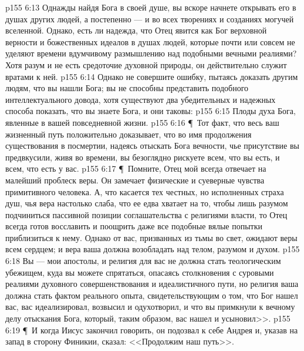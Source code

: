 \vs p155 6:13 Однажды найдя Бога в своей душе, вы вскоре начнете открывать его в душах других людей, а постепенно --- и во всех творениях и созданиях могучей вселенной. Однако, есть ли надежда, что Отец явится как Бог верховной верности и божественных идеалов в душах людей, которые почти или совсем не уделяют времени вдумчивому размышлению над подобными вечными реалиями? Хотя разум и не есть средоточие духовной природы, он действительно служит вратами к ней.
\vs p155 6:14 Однако не совершите ошибку, пытаясь доказать другим людям, что вы нашли Бога; вы не способны представить подобного интеллектуального довода, хотя существуют два убедительных и надежных способа показать, что вы знаете Бога, и они таковы:
\vs p155 6:15 \bibnobreakspace Плоды духа Бога, явленные в вашей повседневной жизни.
\vs p155 6:16 \P\ \bibnobreakspace Тот факт, что весь ваш жизненный путь положительно доказывает, что во имя продолжения существования в посмертии, надеясь отыскать Бога вечности, чье присутствие вы предвкусили, живя во времени, вы безоглядно рискуете всем, что вы есть, и всем, что есть у вас.
\vs p155 6:17 \P\ Помните, Отец мой всегда отвечает на малейший проблеск веры. Он замечает физические и суеверные чувства примитивного человека. А, что касается тех честных, но исполненных страха душ, чья вера настолько слаба, что ее едва хватает на то, чтобы лишь разумом подчиниться пассивной позиции соглашательства с религиями власти, то Отец всегда готов восславить и поощрить даже все подобные вялые попытки приблизиться к нему. Однако от вас, призванных из тьмы во свет, ожидают веры всем сердцем; и вера ваша должна возобладать над телом, разумом и духом.
\vs p155 6:18 Вы --- мои апостолы, и религия для вас не должна стать теологическим убежищем, куда вы можете спрятаться, опасаясь столкновения с суровыми реалиями духовного совершенствования и идеалистичного пути, но религия ваша должна стать фактом реального опыта, свидетельствующим о том, что Бог нашел вас, вас идеализировал, возвысил и одухотворил, и что вы примкнули к вечному делу отыскания Бога, который, таким образом, вас нашел и усыновил>>.
\vs p155 6:19 \P\ И когда Иисус закончил говорить, он подозвал к себе Андрея и, указав на запад в сторону Финикии, сказал: <<Продолжим наш путь>>.
